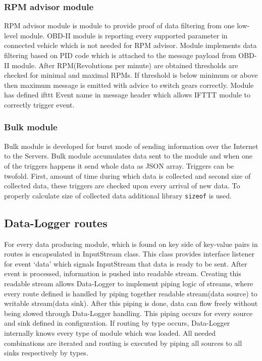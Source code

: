 \subsubsection{RPM advisor module} %
\label{ssub:rpm_advisor_module}
RPM advisor module is module to provide proof of data filtering from one low-level module. OBD-II module is reporting every supported parameter in connected vehicle which is not needed for RPM advisor. Module implements data filtering based on PID code which is attached to the message payload from OBD-II module. After RPM(Revolutions per minute) are obtained thresholds are checked for minimal and maximal RPMs. If threshold is below minimum or above then maximum message is emitted with advice to switch gears correctly. Module has defined ifttt Event name in message header which allows IFTTT module to correctly trigger event.

\subsubsection{Bulk module} %
\label{ssub:bulk_module}
Bulk module is developed for burst mode of sending information over the Internet to the Servers. Bulk module accumulates data sent to the module and when one of the triggers happens it send whole data as JSON array. Triggers can be twofold. First, amount of time during which data is collected and second size of collected data, these triggers are checked upon every arrival of new data. To properly calculate size of collected data additional library \verb|sizeof| is used.
\subsection{Data-Logger routes} %
\label{sub:data_logger_routes}
For every data producing module, which is found on key side of key-value pairs in routes is encapsulated in InputStream class. This class provides interface listener for event `data' which signals InputStream that data is ready to be sent. After event is processed, information is pushed into readable stream. Creating this readable stream allows Data-Logger to implement piping logic of streams, where every route defined is handled by piping together readable stream(data source) to writable stream(data sink). After this piping is done, data can flow freely without being slowed through Data-Logger handling. This piping occurs for every source and sink defined in configuration. If routing by type occurs, Data-Logger internally knows every type of module which was loaded. All needed combinations are iterated and routing is executed by piping all sources to all sinks respectively by types.

